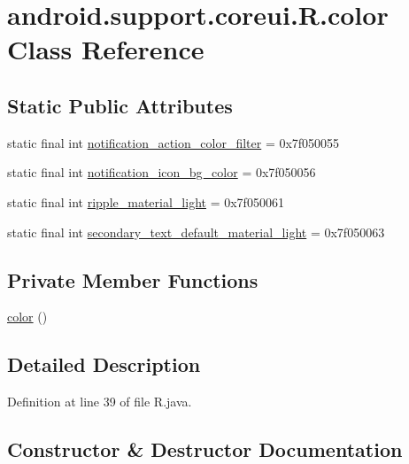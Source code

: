 \hypertarget{classandroid_1_1support_1_1coreui_1_1_r_1_1color}{}\section{android.\+support.\+coreui.\+R.\+color Class Reference}
\label{classandroid_1_1support_1_1coreui_1_1_r_1_1color}
\subsection*{Static Public Attributes}
\begin{DoxyCompactItemize}
\item 
static final int \mbox{\hyperlink{classandroid_1_1support_1_1coreui_1_1_r_1_1color_a139f5da8e0332e3013b4dc87b2a9938d}{notification\+\_\+action\+\_\+color\+\_\+filter}} = 0x7f050055
\item 
static final int \mbox{\hyperlink{classandroid_1_1support_1_1coreui_1_1_r_1_1color_a1b002af9f8cacca635aca4ce35f5a2d2}{notification\+\_\+icon\+\_\+bg\+\_\+color}} = 0x7f050056
\item 
static final int \mbox{\hyperlink{classandroid_1_1support_1_1coreui_1_1_r_1_1color_a6749089d8e376ef1b30cb30a2659fbc3}{ripple\+\_\+material\+\_\+light}} = 0x7f050061
\item 
static final int \mbox{\hyperlink{classandroid_1_1support_1_1coreui_1_1_r_1_1color_ae66a1bd3e1349c908b8345515b469985}{secondary\+\_\+text\+\_\+default\+\_\+material\+\_\+light}} = 0x7f050063
\end{DoxyCompactItemize}
\subsection*{Private Member Functions}
\begin{DoxyCompactItemize}
\item 
\mbox{\hyperlink{classandroid_1_1support_1_1coreui_1_1_r_1_1color_a0a5e9b552778a04384cbd0119ae29b71}{color}} ()
\end{DoxyCompactItemize}


\subsection{Detailed Description}


Definition at line 39 of file R.\+java.



\subsection{Constructor \& Destructor Documentation}
\mbox{\label{classandroid_1_1support_1_1coreui_1_1_r_1_1color_a0a5e9b552778a04384cbd0119ae29b71}} 
